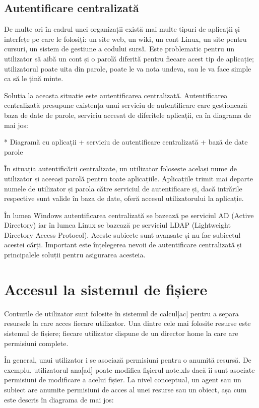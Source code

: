 \subsection{Autentificare centralizată}
\label{sec:users-auth-central}

De multe ori în cadrul unei organizații există mai multe tipuri de aplicații și
interfețe pe care le folosiți: un site web, un wiki, un cont Linux, un site
pentru cursuri, un sistem de gestiune a codului sursă. Este problematic pentru
un utilizator să aibă un cont și o parolă diferită pentru fiecare acest tip de
aplicație; utilizatorul poate uita din parole, poate le va nota undeva, sau le
va face simple ca să le țină minte.

Soluția la aceasta situație este autentificarea centralizată. Autentificarea
centralizată presupune existența unui serviciu de autentificare care gestionează
baza de date de parole, serviciu accesat de diferitele aplicații, ca în diagrama
de mai jos:

* Diagramă cu aplicații + serviciu de autentificare centralizată + bază de date parole

În situația autentificării centralizate, un utilizator folosește același nume de
utilizator și aceeași parolă pentru toate aplicațiile. Aplicațiile trimit mai
departe numele de utilizator și parola către serviciul de autentificare și, dacă
intrările respective sunt valide în baza de date, oferă accesul utilizatorului
la aplicație.

În lumea Windows autentificarea centralizată se bazează pe serviciul AD (Active
Directory) iar în lumea Linux se bazează pe serviciul LDAP (Lightweight
Directory Access Protocol). Aceste subiecte sunt avansate și nu fac subiectul
acestei cărți. Important este înțelegerea nevoii de autentificare centralizată
și principalele soluții pentru asigurarea acesteia.

\section{Accesul la sistemul de fișiere}
\label{sec:users-fs}

Conturile de utilizator sunt folosite în sistemul de calcul[ac] pentru a separa
resursele la care acces fiecare utilizator. Una dintre cele mai folosite resurse
este sistemul de fișiere; fiecare utilizator dispune de un director home la care
are permisiuni complete.

În general, unui utilizator i se asociază permisiuni pentru o anumită resursă.
De exemplu, utilizatorul ana[ad] poate modifica fișierul note.xls dacă îi sunt
asociate permisiuni de modificare a acelui fișier. La nivel conceptual, un agent
sau un subiect are anumite permisiuni de acces al unei resurse sau un obiect,
așa cum este descris în diagrama de mai jos:

